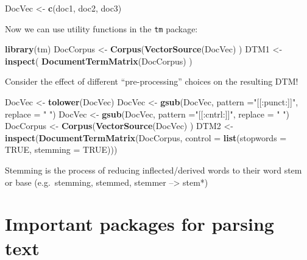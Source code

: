 \documentclass[
]{book}
\newenvironment{Shaded}{\begin{snugshade}}{\end{snugshade}}
\newcommand{\DataTypeTok}[1]{\textcolor[rgb]{0.13,0.29,0.53}{#1}}
\newcommand{\KeywordTok}[1]{\textcolor[rgb]{0.13,0.29,0.53}{\textbf{#1}}}
\newcommand{\NormalTok}[1]{#1}
\newcommand{\OtherTok}[1]{\textcolor[rgb]{0.56,0.35,0.01}{#1}}
\newcommand{\StringTok}[1]{\textcolor[rgb]{0.31,0.60,0.02}{#1}}
\theoremstyle{definition}
\theoremstyle{definition}
\theoremstyle{definition}
\theoremstyle{remark}
\begin{document}
\begin{Shaded}
\begin{Highlighting}[]
\NormalTok{DocVec <{-}}\StringTok{ }\KeywordTok{c}\NormalTok{(doc1, doc2, doc3)}
\end{Highlighting}
\end{Shaded}

Now we can use utility functions in the \texttt{tm} package:

\begin{Shaded}
\begin{Highlighting}[]
\KeywordTok{library}\NormalTok{(tm)}
\NormalTok{DocCorpus <{-}}\StringTok{ }\KeywordTok{Corpus}\NormalTok{(}\KeywordTok{VectorSource}\NormalTok{(DocVec) ) }
\NormalTok{DTM1 <{-}}\StringTok{  }\KeywordTok{inspect}\NormalTok{( }\KeywordTok{DocumentTermMatrix}\NormalTok{(DocCorpus) ) }
\end{Highlighting}
\end{Shaded}

Consider the effect of different ``pre-processing'' choices on the resulting DTM!

\begin{Shaded}
\begin{Highlighting}[]
\NormalTok{DocVec <{-}}\StringTok{ }\KeywordTok{tolower}\NormalTok{(DocVec)}
\NormalTok{DocVec <{-}}\StringTok{ }\KeywordTok{gsub}\NormalTok{(DocVec, }\DataTypeTok{pattern =}\StringTok{"[[:punct:]]"}\NormalTok{, }\DataTypeTok{replace =} \StringTok{" "}\NormalTok{)}
\NormalTok{DocVec <{-}}\StringTok{ }\KeywordTok{gsub}\NormalTok{(DocVec, }\DataTypeTok{pattern =}\StringTok{"[[:cntrl:]]"}\NormalTok{, }\DataTypeTok{replace =} \StringTok{" "}\NormalTok{)}
\NormalTok{DocCorpus <{-}}\StringTok{ }\KeywordTok{Corpus}\NormalTok{(}\KeywordTok{VectorSource}\NormalTok{(DocVec) ) }
\NormalTok{DTM2 <{-}}\StringTok{  }\KeywordTok{inspect}\NormalTok{(}\KeywordTok{DocumentTermMatrix}\NormalTok{(DocCorpus, }
                                    \DataTypeTok{control =} \KeywordTok{list}\NormalTok{(}\DataTypeTok{stopwords =} \OtherTok{TRUE}\NormalTok{,  }\DataTypeTok{stemming =} \OtherTok{TRUE}\NormalTok{))) }
\end{Highlighting}
\end{Shaded}

Stemming is the process of reducing inflected/derived words to their word stem or base (e.g.~stemming, stemmed, stemmer --\textgreater{} stem*)

\hypertarget{important-packages-for-parsing-text}{%
\section{Important packages for parsing text}\label{important-packages-for-parsing-text}}
\end{document}
